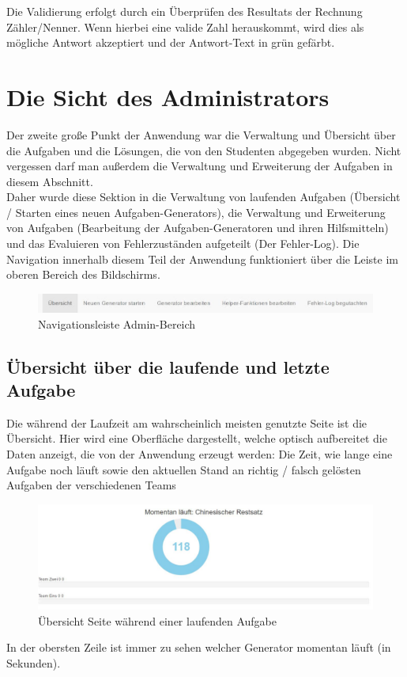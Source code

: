 Die Validierung erfolgt durch ein Überprüfen des Resultats der Rechnung Zähler/Nenner. Wenn hierbei eine valide Zahl herauskommt, wird dies als mögliche Antwort akzeptiert und der Antwort-Text in grün gefärbt.


\section{Die Sicht des Administrators}

Der zweite große Punkt der Anwendung war die Verwaltung und Übersicht über die Aufgaben und die Lösungen, die von den Studenten abgegeben wurden. Nicht vergessen darf man außerdem die Verwaltung und Erweiterung der Aufgaben in diesem Abschnitt. \\

Daher wurde diese Sektion in die Verwaltung von laufenden Aufgaben (Übersicht / Starten eines neuen Aufgaben-Generators), die Verwaltung und Erweiterung von Aufgaben (Bearbeitung der Aufgaben-Generatoren und ihren Hilfsmitteln) und das Evaluieren von Fehlerzuständen aufgeteilt (Der Fehler-Log). Die Navigation innerhalb diesem Teil der Anwendung funktioniert über die Leiste im oberen Bereich des Bildschirms. \\
\begin{figure}[htp]     %
\centering
\includegraphics[width=1\textwidth]{bilder/NavBar} 
\caption[Navigationsleiste Admin-Bereich]{Navigationsleiste Admin-Bereich}
\end{figure} 

\subsection{Übersicht über die laufende und letzte Aufgabe}

Die während der Laufzeit am wahrscheinlich meisten genutzte Seite ist die Übersicht. Hier wird eine Oberfläche dargestellt, welche optisch aufbereitet die Daten anzeigt, die von der Anwendung erzeugt werden: Die Zeit, wie lange eine Aufgabe noch läuft sowie den aktuellen Stand an richtig / falsch gelösten Aufgaben der verschiedenen Teams \\
\begin{figure}[htp]     %
\centering
\includegraphics[width=1\textwidth]{bilder/Overview} 
\caption[Übersicht Seite während einer laufenden Aufgabe]{Übersicht Seite während einer laufenden Aufgabe}
\end{figure} 
In der obersten Zeile ist immer zu sehen welcher Generator momentan läuft (in Sekunden).

